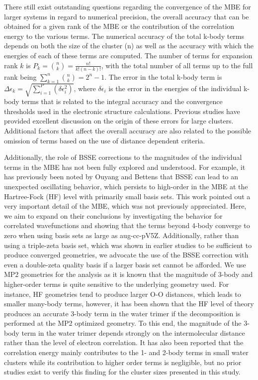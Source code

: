 \documentclass [11pt, proquest] {uwthesis}[2020/02/24]
\begin{document}
\par There still exist outstanding questions regarding the convergence of the MBE for larger systems in regard to numerical precision, the overall accuracy that can be obtained for a given rank of the MBE\autocite{lao_understanding_2016, richard_understanding_2014} or the contribution of the correlation energy to the various terms. The numerical accuracy of the total k-body terms depends on both the size of the cluster (n) as well as the accuracy with which the energies of each of these terms are computed. The number of terms for expansion rank $k$ is $P_k=\binom{n}{k}=\frac{n!}{k!(n-k)!}$, with the total number of all terms up to the full rank being $\sum_{k=1}^{n}\binom{n}{k}=2^n-1$. The error in the total k-body term is $\Delta\epsilon_k=\sqrt{\sum_{i=1}^P(\delta\epsilon_i^2)}$, where $\delta\epsilon_i$ is the error in the energies of the individual k-body terms that is related to the integral accuracy and the convergence thresholds used in the electronic structure calculations. Previous studies have provided excellent discussion\autocite{lao_understanding_2016, richard_understanding_2014} on the origin of these errors for large clusters.  Additional factors that affect the overall accuracy are also related to the possible omission of terms based on the use of distance dependent criteria.
\par Additionally, the role of BSSE corrections to the magnitudes of the individual terms in the MBE has not been fully explored and understood. For example, it has previously been noted by Ouyang and Bettens that BSSE can lead to an unexpected oscillating behavior, which persists to high-order in the MBE at the Hartree-Fock (HF) level with primarily small basis sets.\autocite{ouyang_trouble_2014} This work pointed out a very important detail of the MBE, which was not previously appreciated. Here, we aim to expand on their conclusions by investigating the behavior for correlated wavefunctions and showing that the terms beyond 4-body converge to zero when using basis sets as large as aug-cc-pV5Z. Additionally, rather than using a triple-zeta basis set, which was shown in earlier studies to be sufficient to produce converged geometries,\autocite{xantheas_ab_1994, miliordos_optimal_2013} we advocate the use of the BSSE correction with even a double-zeta quality basis if a larger basis set cannot be afforded. We use MP2 geometries for the analysis as it is known that the magnitude of 3-body and higher-order terms is quite sensitive to the underlying geometry used. For instance, HF geometries tend to produce larger O-O distances,\autocite{miliordos_optimal_2013} which leads to smaller many-body terms, however, it has been shown that the HF level of theory produces an accurate 3-body term in the water trimer if the decomposition is performed at the MP2 optimized geometry.\autocite{klopper_ab_1995} To this end, the magnitude of the 3-body term in the water trimer depends strongly on the intermolecular distance rather than the level of electron correlation. It has also been reported that the correlation energy mainly contributes to the 1- and 2-body terms in small water clusters while its contribution to higher order terms is negligible,\autocite{dahlke_electrostatically_2007} but no prior studies exist to verify this finding for the cluster sizes presented in this study.
\end{document}
